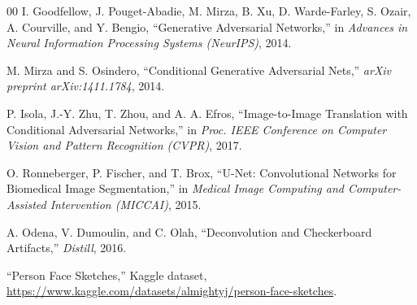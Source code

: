 \documentclass[conference]{IEEEtran}
\begin{document}
\begin{thebibliography}{00}
 I. Goodfellow, J. Pouget-Abadie, M. Mirza, B. Xu, D. Warde-Farley,
S. Ozair, A. Courville, and Y. Bengio, ``Generative Adversarial Networks,'' in
\textit{Advances in Neural Information Processing Systems (NeurIPS)}, 2014.

 M. Mirza and S. Osindero, ``Conditional Generative Adversarial
Nets,'' \textit{arXiv preprint arXiv:1411.1784}, 2014.

 P. Isola, J.-Y. Zhu, T. Zhou, and A. A. Efros, ``Image-to-Image
Translation with Conditional Adversarial Networks,'' in \textit{Proc. IEEE Conference on
Computer Vision and Pattern Recognition (CVPR)}, 2017.

 O. Ronneberger, P. Fischer, and T. Brox, ``U-Net:
Convolutional Networks for Biomedical Image Segmentation,'' in \textit{Medical Image
Computing and Computer-Assisted Intervention (MICCAI)}, 2015.

 A. Odena, V. Dumoulin, and C. Olah, ``Deconvolution and
Checkerboard Artifacts,'' \textit{Distill}, 2016.

 ``Person Face Sketches,'' Kaggle dataset,
\url{https://www.kaggle.com/datasets/almightyj/person-face-sketches}.

\end{thebibliography}
\end{document}
